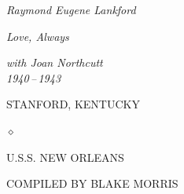 
\cleardoublepage
\thispagestyle{laempty}
\vspace*{0.18\textheight}
\begin{center}
    \par
    \vspace{0.8em}
    {\fontsize{38pt}{42pt}\selectfont\displayfont\itshape Raymond Eugene Lankford\par}
    \vspace{1.4em}
    \brassornament
    \vspace{1.2em}
    {\Huge\displayfont\itshape Love, Always\par}
    \vspace{1.6em}
    {\displayfont\itshape\large
        with Joan Northcutt\\
        \vspace{0.2em}
        1940\,--\,1943\par}
    \vspace{2.2em}
    \brassornament
    \vspace{1.4em}
    {\monofont\small{}\color{walnutmute}
        STANFORD, KENTUCKY\par
        \vspace{0.3em}
        {\color{brass}$\diamond$}\par
        \vspace{0.3em}
        U.S.S. NEW ORLEANS\par}
\end{center}
\vfill
\begin{center}
    {\monofont\footnotesize\color{walnutmute}
        COMPILED BY BLAKE MORRIS\par}
\end{center}
\vspace*{0.6em}
